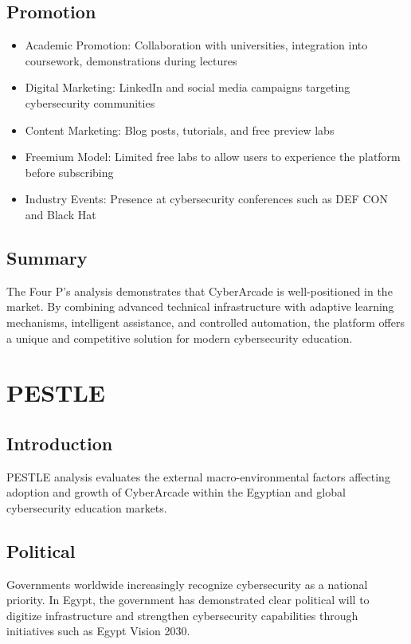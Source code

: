 \documentclass[12pt,a4paper]{report}
\begin{document}
\subsection{Promotion}
\begin{itemize}
  \item Academic Promotion: Collaboration with universities, integration into coursework, demonstrations during lectures
  \item Digital Marketing: LinkedIn and social media campaigns targeting cybersecurity communities
  \item Content Marketing: Blog posts, tutorials, and free preview labs
  \item Freemium Model: Limited free labs to allow users to experience the platform before subscribing
  \item Industry Events: Presence at cybersecurity conferences such as DEF CON and Black Hat
\end{itemize}

\subsection{Summary}

The Four P's analysis demonstrates that CyberArcade is well-positioned in the market. By combining
advanced technical infrastructure with adaptive learning mechanisms, intelligent assistance, and
controlled automation, the platform offers a unique and competitive solution for modern cybersecurity
education.

\section{PESTLE}

\subsection{Introduction}

PESTLE analysis evaluates the external macro-environmental factors affecting adoption and growth of
CyberArcade within the Egyptian and global cybersecurity education markets.

\subsection{Political}

Governments worldwide increasingly recognize cybersecurity as a national priority. In Egypt, the
government has demonstrated clear political will to digitize infrastructure and strengthen
cybersecurity capabilities through initiatives such as Egypt Vision 2030.
\end{document}
